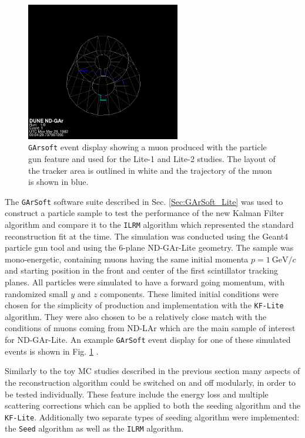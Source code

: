 \begin{figure}[t]
     \centering
     \includegraphics[width=0.6\textwidth]{figures/ch4-KF_NDGArLite/MC/EvtDisplay.png}
     \caption[\texttt{GArsoft} event display showing a muon produced with the particle gun feature.]{\texttt{GArsoft} event display showing a muon produced with the particle gun feature and used for the Lite-1 and Lite-2 studies. The layout of the tracker area is outlined in white and the trajectory of the muon is shown in blue. }
        \label{fig:GArLiteMuonEvent}
\end{figure} 

The \texttt{GArSoft} software suite described in Sec. \ref{Sec:GArSoft_Lite} was used to construct a particle sample to test the performance of the new Kalman Filter algorithm and compare it to the \texttt{ILRM} algorithm which represented the standard reconstruction fit at the time. The simulation was conducted using the Geant4 particle gun tool and using the 6-plane ND-GAr-Lite geometry. The sample was mono-energetic, containing muons having the same initial momenta $p=1\ \text{GeV}/c$ and starting position in the front and center of the first scintillator tracking planes.  All particles were simulated to have a forward going momentum, with randomized small $y$ and $z$ components. These limited initial conditions were chosen for the simplicity of production and implementation with the \texttt{KF-Lite} algorithm. They were also chosen to be a relatively close match with the conditions of muons coming from ND-LAr which are the main sample of interest for ND-GAr-Lite. An example \texttt{GArSoft} event display for one of these simulated events is shown in Fig. \ref{fig:GArLiteMuonEvent} .  

Similarly to the toy MC studies described in the previous section many aspects of the reconstruction algorithm could be switched on and off modularly, in order to be tested individually. These feature include the energy loss and multiple scattering corrections which can be applied to both the seeding algorithm and the \texttt{KF-Lite}. Additionally two separate types of seeding algorithm were implemented: the \texttt{Seed} algorithm as well as the \texttt{ILRM} algorithm. 

